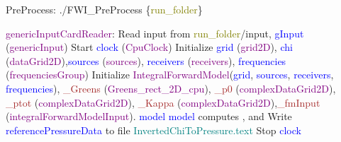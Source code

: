 \documentclass{article}
\begin{document}
\begin{algorithm}
\caption{PreProcess: ./FWI\_PreProcess \{\textcolor{olive}{run\_folder}\}}
\begin{algorithmic}
\State \textcolor{purple}{genericInputCardReader}: Read input from \textcolor{olive}{run\_folder}/input, \textcolor{blue}{gInput} (\textcolor{purple}{genericInput})
\State Start \textcolor{blue}{clock} (\textcolor{purple}{CpuClock})
\State Initialize \textcolor{blue}{grid} (\textcolor{purple}{grid2D}), \textcolor{blue}{chi} (\textcolor{purple}{dataGrid2D}),\State \textcolor{blue}{sources} (\textcolor{purple}{sources}), \textcolor{blue}{receivers} (\textcolor{purple}{receivers}), \textcolor{blue}{frequencies} (\textcolor{purple}{frequenciesGroup})
\State {}
\State Initialize \textcolor{purple}{IntegralForwardModel}(\textcolor{blue}{grid}, \textcolor{blue}{sources}, \textcolor{blue}{receivers}, \textcolor{blue}{frequencies}), \State \textcolor{brown}{\_Greens} (\textcolor{purple}{Greens\_rect\_2D\_cpu}), \textcolor{brown}{\_p0} (\textcolor{purple}{complexDataGrid2D}), \State \textcolor{brown}{\_ptot} (\textcolor{purple}{complexDataGrid2D}), \textcolor{brown}{\_Kappa} (\textcolor{purple}{complexDataGrid2D}),\State \textcolor{brown}{\_fmInput} (\textcolor{purple}{integralForwardModelInput}).
\State \Return \textcolor{blue}{model}
\EndProcedure
\State \textcolor{blue}{model} computes ,  and 
\State Write \textcolor{blue}{referencePressureData} to file \textcolor{teal}{InvertedChiToPressure.text}
\EndProcedure
\State Stop \textcolor{blue}{clock}
\end{algorithmic}
\end{algorithm}
\end{document}
